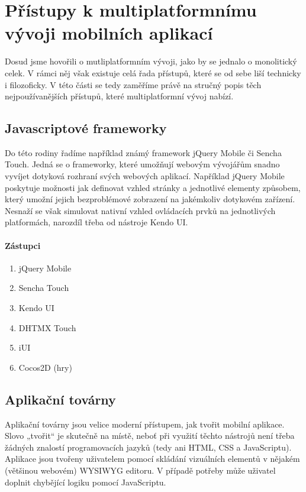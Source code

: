 \section{Přístupy k multiplatformnímu vývoji mobilních aplikací}
Dosud jsme hovořili o mutliplatformním vývoji, jako by se jednalo o monolitický celek. V rámci něj však existuje celá řada přístupů, které se od sebe liší technicky i filozoficky. V této části se tedy zaměříme právě na stručný popis těch nejpoužívanějších přístupů, které multiplatformní vývoj nabízí.

\subsection{Javascriptové frameworky}
Do této rodiny řadíme například známý framework jQuery Mobile či Sencha Touch. Jedná se o frameworky, které umožňují webovým vývojářům snadno vyvíjet dotyková rozhraní svých webových aplikací. Například jQuery Mobile poskytuje možnosti jak definovat vzhled stránky a jednotlivé elementy způsobem, který umožní jejich bezproblémové zobrazení na jakémkoliv dotykovém zařízení. Nesnaží se však simulovat nativní vzhled ovládacích prvků na jednotlivých platformách, narozdíl třeba od nástroje Kendo UI.

\paragraph{Zástupci}
\begin{enumerate}
	\item jQuery Mobile
	\item Sencha Touch
	\item Kendo UI
	\item DHTMX Touch
	\item iUI
	\item Cocos2D (hry)
\end{enumerate}

\subsection{Aplikační továrny}
Aplikační továrny jsou velice moderní přístupem, jak tvořit mobilní aplikace. Slovo „tvořit“ je skutečně na místě, neboť při využití těchto nástrojů není třeba žádných znalostí programovacích jazyků (tedy ani HTML, CSS a JavaScriptu). Aplikace jsou tvořeny uživatelem pomocí skládání vizuálních elementů v nějakém (většinou webovém) WYSIWYG editoru. V případě potřeby může uživatel doplnit chybějící logiku pomocí JavaScriptu.

